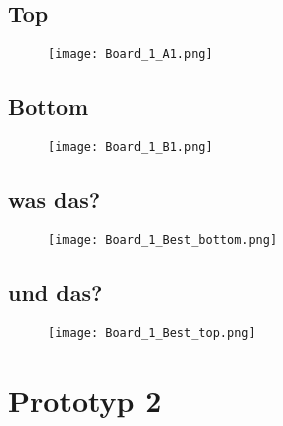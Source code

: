 \subsection*{Top}
\begin{figure}[htb]
\begin{center}
\texttt{[image: Board\_1\_A1.png]}
\end{center}
\end{figure}

\newpage
\subsection*{Bottom}
\begin{figure}[htb]
\begin{center}
\texttt{[image: Board\_1\_B1.png]}
\end{center}
\end{figure}

\newpage
\subsection*{was das?}
\begin{figure}[htb]
\begin{center}
\texttt{[image: Board\_1\_Best\_bottom.png]}
\end{center}
\end{figure}

\newpage
\subsection*{und das?}
\begin{figure}[htb]
\begin{center}
\texttt{[image: Board\_1\_Best\_top.png]}
\end{center}
\end{figure}








\section{Prototyp 2}








